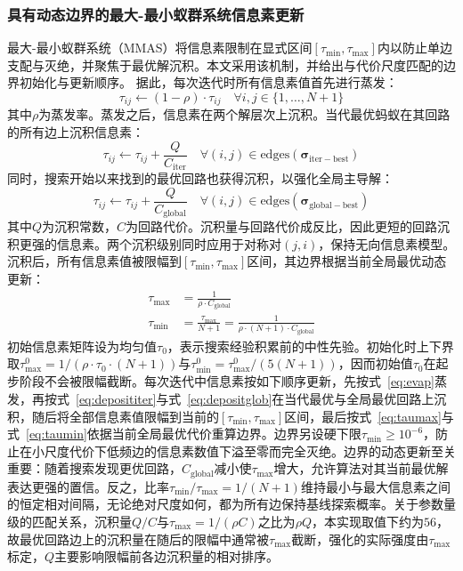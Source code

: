 \documentclass[lettersize,journal]{IEEEtran}
\begin{document}
\subsubsection{具有动态边界的最大-最小蚁群系统信息素更新}
最大-最小蚁群系统（MMAS）\textcolor{blue}{\cite{ref23}}将信息素限制在显式区间$[\tau_{\min}, \tau_{\max}]$内以防止单边支配与灭绝，并聚焦于最优解沉积。本文采用该机制，并给出与代价尺度匹配的边界初始化与更新顺序。
据此，每次迭代时所有信息素值首先进行蒸发：
\begin{equation}
\tau_{ij} \leftarrow (1 - \rho) \cdot \tau_{ij} \quad \forall i, j \in \{1, \dots, N+1\}
\label{eq:evap}
\end{equation}
其中$\rho$为蒸发率。蒸发之后，信息素在两个解层次上沉积。当代最优蚂蚁在其回路的所有边上沉积信息素：
\begin{equation}
\tau_{ij} \leftarrow \tau_{ij} + \frac{Q}{C_{\mathrm{iter}}} \quad \forall (i, j) \in \mathrm{edges}(\bm{\sigma}_{\mathrm{iter-best}})
\label{eq:deposititer}
\end{equation}
同时，搜索开始以来找到的最优回路也获得沉积，以强化全局主导解：
\begin{equation}
\tau_{ij} \leftarrow \tau_{ij} + \frac{Q}{C_{\mathrm{global}}} \quad \forall (i, j) \in \mathrm{edges}(\bm{\sigma}_{\mathrm{global-best}})
\label{eq:depositglob}
\end{equation}
其中$Q$为沉积常数，$C$为回路代价。沉积量与回路代价成反比，因此更短的回路沉积更强的信息素。两个沉积级别同时应用于对称对$(j, i)$，保持无向信息素模型。
沉积后，所有信息素值被限幅到$[\tau_{\min}, \tau_{\max}]$区间，其边界根据当前全局最优动态更新：
\begin{align}
\tau_{\max} &= \frac{1}{\rho \cdot C_{\mathrm{global}}}
\label{eq:taumax}\\
\tau_{\min} &= \frac{\tau_{\max}}{N+1} = \frac{1}{\rho \cdot (N+1) \cdot C_{\mathrm{global}}}
\label{eq:taumin}
\end{align}
初始信息素矩阵设为均匀值$\tau_0$，表示搜索经验积累前的中性先验。初始化时上下界取$\tau_{\max}^{0} = 1/(\rho \cdot \tau_0 \cdot (N+1))$与$\tau_{\min}^{0} = \tau_{\max}^{0}/(5(N+1))$，因而初始值$\tau_0$在起步阶段不会被限幅截断。每次迭代中信息素按如下顺序更新，先按式~\textcolor{blue}{\eqref{eq:evap}}蒸发，再按式~\textcolor{blue}{\eqref{eq:deposititer}}与式~\textcolor{blue}{\eqref{eq:depositglob}}在当代最优与全局最优回路上沉积，随后将全部信息素值限幅到当前的$[\tau_{\min}, \tau_{\max}]$区间，最后按式~\textcolor{blue}{\eqref{eq:taumax}}与式~\textcolor{blue}{\eqref{eq:taumin}}依据当前全局最优代价重算边界。边界另设硬下限$\tau_{\min} \geq 10^{-6}$，防止在小尺度代价下低频边的信息素数值下溢至零而完全灭绝。边界的动态更新至关重要：随着搜索发现更优回路，$C_{\mathrm{global}}$减小使$\tau_{\max}$增大，允许算法对其当前最优解表达更强的置信。反之，比率$\tau_{\min}/\tau_{\max} = 1/(N+1)$维持最小与最大信息素之间的恒定相对间隔，无论绝对尺度如何，都为所有边保持基线探索概率。关于参数量级的匹配关系，沉积量$Q/C$与$\tau_{\max} = 1/(\rho C)$之比为$\rho Q$，本实现取值下约为$56$，故最优回路边上的沉积量在随后的限幅中通常被$\tau_{\max}$截断，强化的实际强度由$\tau_{\max}$标定，$Q$主要影响限幅前各边沉积量的相对排序。
\end{document}
